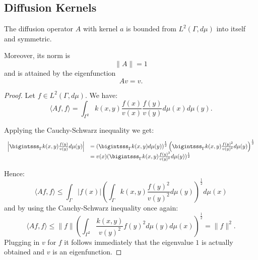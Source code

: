 \subsection{Diffusion Kernels}
\begin{theorem}
The diffusion operator $A$ with kernel $a$ is bounded from $L^2(\Gamma, d\mu)$ into itself and symmetric.

Moreover, its norm is $$\|A\|=1$$ and is attained by the eigenfunction $$Av=v.$$
\end{theorem}
\begin{proof}
Let $f\in L^2(\Gamma, d\mu)$. We have:
\begin{equation}\label{eq:positivityOfA}
\langle Af,f \rangle = \int_{\Gamma^2}k(x,y)\frac{f(x)}{v(x)}\frac{f(y)}{v(y)}d\mu(x)d\mu(y).
\end{equation}

Applying the Cauchy-Schwarz inequality we get:
\begin{equation*}\begin{array}{l l}
\left|\bigintsss_\Gamma k(x,y)\frac{f(y)}{v(y)}d\mu(y)\right| &= 
\left(\bigintsss_\Gamma k(x,y)d\mu(y)\right)^{\frac{1}{2}}
\left(\bigintsss_\Gamma k(x,y)\frac{f(y)^2}{v(y)^2} d\mu(y)\right)^{\frac{1}{2}} \\
&=v(x)(\bigintsss_\Gamma k(x,y)\frac{f(y)^2}{v(y)^2} d\mu(y))^{\frac{1}{2}}
\end{array}\end{equation*}

Hence:
$$\langle Af,f \rangle \leq \int_\Gamma |f(x)|\left(\int_\Gamma k(x,y)\frac{f(y)^2}{v(y)^2} d\mu(y)\right)^{\frac{1}{2}}d\mu(x)$$
and by using the Cauchy-Schwarz inequality once again:
$$\langle Af,f \rangle \leq \|f\|\left(\int_{\Gamma^2} \frac{k(x,y)}{v(y)^2}f(y)^2 d\mu(y)d\mu(x)\right)^{\frac{1}{2}} = \|f\|^2.$$
Plugging in $v$ for $f$ it follows immediately that the eigenvalue $1$ is actually obtained and $v$ is an eigenfunction.
\end{proof}

